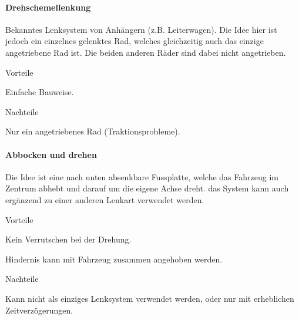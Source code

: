 \documentclass[../main.tex]{subfiles}
\begin{document}
\paragraph{Drehschemellenkung} \label{recherche-drehschemellenkung}

Bekanntes Lenksystem von Anhängern (z.B. Leiterwagen). Die Idee hier ist jedoch ein einzelnes gelenktes Rad, welches gleichzeitig auch das einzige angetriebene Rad ist. Die beiden anderen Räder sind dabei nicht angetrieben.

\begin{minipage}[t]{0.48\textwidth}
    \begin{items}
      \item [Vorteile]
      \item Einfache Bauweise.
 \end{items}
\end{minipage}
\hfill
\begin{minipage}[t]{0.48\textwidth}
    \begin{items}
      \item [Nachteile]
      \item Nur ein angetriebenes Rad (Traktionsprobleme).
    \end{items}
\end{minipage}

\paragraph{Abbocken und drehen} \label{recherche-abbocken-und-drehen}

Die Idee ist eine nach unten absenkbare Fussplatte, welche das Fahrzeug im Zentrum abhebt und darauf um die eigene Achse dreht. das System kann auch ergänzend zu einer anderen Lenkart verwendet werden.

\begin{minipage}[t]{0.48\textwidth}
    \begin{items}
      \item [Vorteile]
      \item Kein Verrutschen bei der Drehung.
      \item Hindernis kann mit Fahrzeug zusammen angehoben werden.
 \end{items}
\end{minipage}
\hfill
\begin{minipage}[t]{0.48\textwidth}
    \begin{items}
      \item [Nachteile]
      \item Kann nicht als einziges Lenksystem verwendet werden, oder nur mit erheblichen Zeitverzögerungen.
    \end{items}
\end{minipage}
\end{document}

